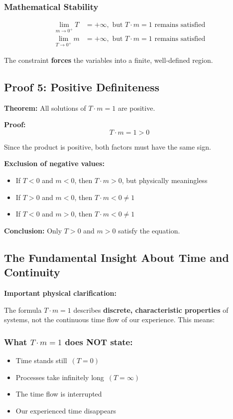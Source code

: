 \documentclass[12pt,a4paper]{article}
\theoremstyle{definition}
\theoremstyle{remark}
\begin{document}
	\subsubsection{Mathematical Stability}
	\begin{align}
		\lim_{m \to 0^+} T &= +\infty, \text{ but } T \cdot m = 1 \text{ remains satisfied}\\
		\lim_{T \to 0^+} m &= +\infty, \text{ but } T \cdot m = 1 \text{ remains satisfied}
	\end{align}
	
	The constraint \textbf{forces} the variables into a finite, well-defined region.
	
	\subsection{Proof 5: Positive Definiteness}
	
	\textbf{Theorem:} All solutions of $T \cdot m = 1$ are positive.
	
	\textbf{Proof:}
	\begin{equation}
		T \cdot m = 1 > 0
	\end{equation}
	
	Since the product is positive, both factors must have the same sign.
	
	\textbf{Exclusion of negative values:}
	\begin{itemize}
		\item If $T < 0$ and $m < 0$, then $T \cdot m > 0$, but physically meaningless
		\item If $T > 0$ and $m < 0$, then $T \cdot m < 0 \neq 1$
		\item If $T < 0$ and $m > 0$, then $T \cdot m < 0 \neq 1$
	\end{itemize}
	
	\textbf{Conclusion:} Only $T > 0$ and $m > 0$ satisfy the equation.
	
	\subsection{The Fundamental Insight About Time and Continuity}
	
	\textbf{Important physical clarification:}
	
	The formula $T \cdot m = 1$ describes \textbf{discrete, characteristic properties} of systems, not the continuous time flow of our experience. This means:
	
	\subsubsection{What $T \cdot m = 1$ does NOT state:}
	\begin{itemize}
		\item \glqq Time stands still\grqq\ $(T = 0)$
		\item \glqq Processes take infinitely long\grqq\ $(T = \infty)$
		\item \glqq The time flow is interrupted\grqq
		\item \glqq Our experienced time disappears\grqq
	\end{itemize}
	
\end{document}
